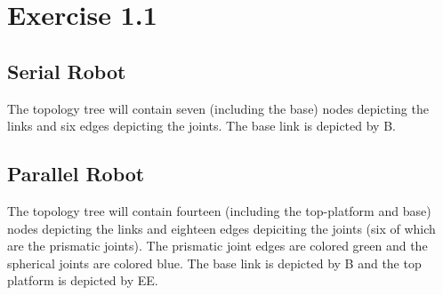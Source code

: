 \section{Exercise 1.1}
\subsection{Serial Robot}
The topology tree will contain seven (including the base) nodes depicting the links and six edges depicting the joints. The base link is depicted by B.
 \begin{figure}[h!]
 	\centering
 	
 \end{figure}
\subsection{Parallel Robot}
The topology tree will contain fourteen (including the top-platform and base) nodes depicting the links and eighteen edges depiciting the joints (six of which are the prismatic joints). The prismatic joint edges are colored green and the spherical joints are colored blue. The base link is depicted by B and the top platform is depicted by EE.
 \begin{figure}[h!]
	\centering
	
\end{figure}